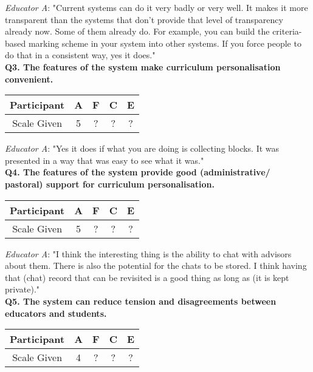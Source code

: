 \textit{Educator A}: "Current systems can do it very badly or very well. It makes it more transparent than 
the systems that don't provide that level of transparency already now. Some of them already do. For example, 
you can build the criteria-based marking scheme in your system into other systems. If you force people to do that 
in a consistent way, yes it does."\\

\textbf{Q3. The features of the system make curriculum personalisation convenient.}\\
\begin{table}[!ht] 
    \centering
    \begin{tabularx}{0.325\textwidth}{|c|c|c|c|c|}
        \hline
        Participant & A & F & C & E \\
        \hline
        Scale Given & 5 & ? & ? & ? \\
        \hline
    \end{tabularx}
\end{table}

\textit{Educator A}: "Yes it does if what you are doing is collecting blocks. It was presented in a way that was 
easy to see what it was."\\

\textbf{Q4. The features of the system provide good (administrative/ pastoral) support for curriculum personalisation.}\\
\begin{table}[!ht] 
    \centering
    \begin{tabularx}{0.325\textwidth}{|c|c|c|c|c|}
        \hline
        Participant & A & F & C & E \\
        \hline
        Scale Given & 5 & ? & ? & ? \\
        \hline
    \end{tabularx}
\end{table}

\textit{Educator A}: "I think the interesting thing is the ability to chat with advisors about them. 
There is also the potential for the chats to be stored. 
I think having that (chat) record that can be revisited is a good thing as long as (it is kept private)."\\

\textbf{Q5. The system can reduce tension and disagreements between educators and students.}\\
\begin{table}[!ht] 
    \centering
    \begin{tabularx}{0.325\textwidth}{|c|c|c|c|c|}
        \hline
        Participant & A & F & C & E \\
        \hline
        Scale Given & 4 & ? & ? & ? \\
        \hline
    \end{tabularx}
\end{table}

